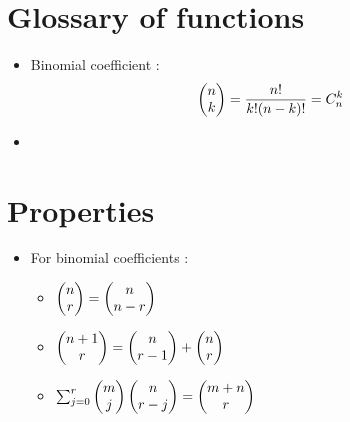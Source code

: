 \documentclass[12pt,a4paper]{article}
\begin{document}
\section{Glossary of functions}
\begin{itemize}
    \item Binomial coefficient :
            \begin{equation}
                \begin{pmatrix} n \\ k \end{pmatrix} = \frac{n!}{k!(n-k)!} = C_n^k
            \end{equation}
    \item 
\end{itemize}

\section{Properties}
\begin{itemize}
    \item For binomial coefficients :
            \begin{itemize}
                \item $\begin{pmatrix} n \\ r \end{pmatrix} = \begin{pmatrix} n \\ n-r \end{pmatrix}$
                \item $\begin{pmatrix} n+1 \\ r \end{pmatrix} = \begin{pmatrix} n \\ r-1 \end{pmatrix} + \begin{pmatrix} n \\ r \end{pmatrix}$
                \item $\sum_{j=0}^{r}\begin{pmatrix} m \\ j \end{pmatrix}\begin{pmatrix} n \\ r-j \end{pmatrix} = \begin{pmatrix} m+n \\ r \end{pmatrix}$
\end{itemize}
\end{itemize}
\end{document}
